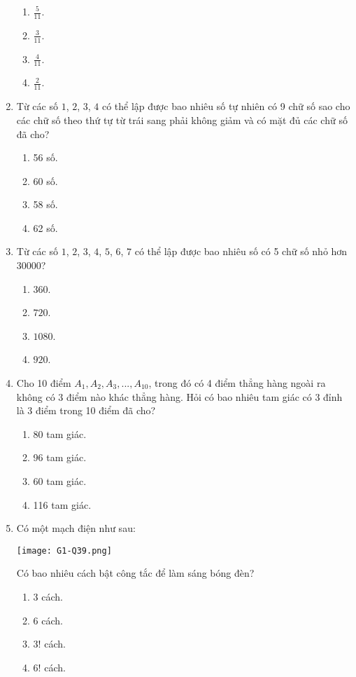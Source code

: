 \begin{enumerate}[label=\textbf{Câu \arabic*.},align=left,left=0cm..0cm,itemindent=*]
\begin{enumerate}[label=\textbf{\Alph*.},align=left,left=1cm..0cm,itemindent=*]
		\item $\frac{5}{11}$. \item $\frac{3}{11}$. \item $\frac{4}{11}$. \item $\frac{2}{11}$.
	\end{enumerate}
	\item Từ các số $1$, $2$, $3$, $4$ có thể lập được bao nhiêu số tự nhiên có 9 chữ số sao cho các chữ số theo thứ tự từ trái sang phải không giảm và có mặt đủ các chữ số đã cho?
	\begin{enumerate}[label=\textbf{\Alph*.},align=left,left=1cm..0cm,itemindent=*]
		\item 56 số. \item 60 số. \item 58 số. \item 62 số.
	\end{enumerate}
	\item Từ các số $1$, $2$, $3$, $4$, $5$, $6$, $7$ có thể lập được bao nhiêu số có 5 chữ số nhỏ hơn $30000$?
	\begin{enumerate}[label=\textbf{\Alph*.},align=left,left=1cm..0cm,itemindent=*]
		\item $360$. \item $720$. \item $1080$. \item $920$.
	\end{enumerate}
	\item Cho 10 điểm $A_1, A_2, A_3,..., A_{10}$, trong đó có 4 điểm thẳng hàng ngoài ra không có 3 điểm nào khác thẳng hàng. Hỏi có bao nhiêu tam giác có 3 đỉnh là 3 điểm trong 10 điểm đã cho?
	\begin{enumerate}[label=\textbf{\Alph*.},align=left,left=1cm..0cm,itemindent=*]
		\item 80 tam giác. \item 96 tam giác. \item 60 tam giác. \item 116 tam giác.
	\end{enumerate}
	\item Có một mạch điện như sau:\par
	{\centering\texttt{[image: G1-Q39.png]}\par}
	Có bao nhiêu cách bật công tắc để làm sáng bóng đèn?
	\begin{enumerate}[label=\textbf{\Alph*.},align=left,left=1cm..0cm,itemindent=*]
		\item 3 cách. \item 6 cách. \item $3!$ cách. \item $6!$ cách.

\end{enumerate}
\end{enumerate}
